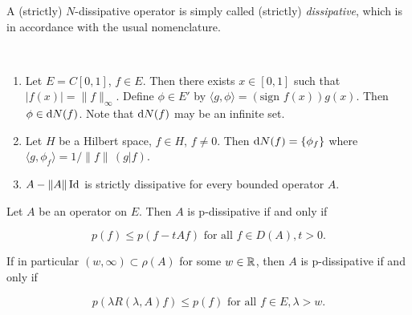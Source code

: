 A (strictly) $N$-dissipative operator is simply called (strictly) \emph{dissipative}, which is in accordance with the usual nomenclature.
\begin{examples}\label{ex:a2-2.2}  ~ 
\begin{enumerate}[\upshape(i), wide, labelsep=.5em]

\item \label{ex:a2-2.2.1}
Let $E = C[0,1]$, $f \in E$.
Then there exists $x \in [0,1]$ such that $|f(x)| = \|f\|_{\infty}$.
Define $\phi \in E'$ by $\langle g,\phi \rangle = (\text{sign } f(x))g(x)$.
Then $\phi \in \mathop{}\!\mathrm{d}{N}(f)$.
Note that $\mathop{}\!\mathrm{d}{N}(f)$ may be an infinite set.
\item \label{ex:a2-2.2.2}
Let $H$ be a Hilbert space, $f \in H$, $f \neq 0$.
Then  $\mathop{}\!\mathrm{d}{N}(f) = \{\phi_{f}\}$ where \\
$\langle g,\phi_{f} \rangle = 1/\|f\|\,(g|f)$.
\item \label{ex:a2-2.2.3}
$A - \|A\|\operatorname{Id}$ is strictly dissipative for every bounded operator $A$.
\end{enumerate}
\end{examples}
\begin{proposition}\label{prop:a2-2.3}
Let $A$ be an operator on $E$.
Then $A$ is p-dissipative if and only if

\begin{equation} \label{eq:a2-2.7}
p(f) \leq p(f - tAf) \text{ for all } f \in D(A), t > 0.
\end{equation}

If in particular $(w,\infty) \subset \rho(A)$ for some $w \in \mathbb{R}$, then $A$ is p-dissipative if and only if

\begin{equation}\label{eq:a2-2.8}
p(\lambda R(\lambda,A)f) \leq p(f) \text{ for all } f \in E, \lambda > w.
\end{equation}
\end{proposition}

